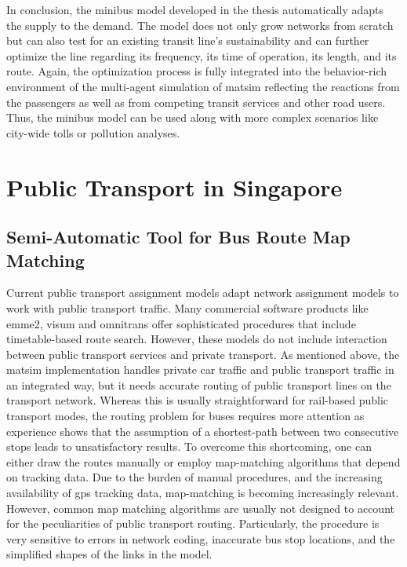 In conclusion, the minibus model developed in the thesis automatically adapts the supply to the demand. The model does not only grow networks from scratch but can also test for an existing transit line's sustainability and can further optimize the line regarding its frequency, its time of operation, its length, and its route. Again, the optimization process is fully integrated into the behavior-rich environment of the multi-agent simulation of \gls{matsim} reflecting the reactions from the passengers as well as from competing transit services and other road users. Thus, the minibus model can be used along with more complex scenarios like city-wide tolls or pollution analyses.

\section{Public Transport in Singapore}
\subsection{Semi-Automatic Tool for Bus Route Map Matching}
\label{sec:SemiTool}
Current public transport assignment models adapt network assignment models to work with public transport traffic. Many commercial software products like \gls{emme2}, \gls{visum} and \gls{omnitrans} offer sophisticated procedures that include timetable-based route search. However, these models do not include interaction between public transport services and private transport. As mentioned above, the \gls{matsim} implementation handles private car traffic and public transport traffic in an integrated way, but it needs accurate routing of public transport lines on the transport network. Whereas this is usually straightforward for rail-based public transport modes, the routing problem for buses requires more attention as experience shows that the assumption of a shortest-path between two consecutive stops leads to unsatisfactory results. To overcome this shortcoming, one can either draw the routes manually or employ map-matching algorithms that depend on tracking data. Due to the burden of manual procedures, and the increasing availability of \gls{gps} tracking data, map-matching is becoming increasingly relevant. However, common map matching algorithms are usually not designed to account for the peculiarities of public transport routing. Particularly, the procedure is very sensitive to errors in network coding, inaccurate bus stop locations, and the simplified shapes of the links in the model.

